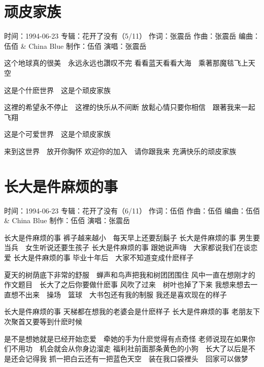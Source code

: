 \documentclass[UTF8,a4paper,oneside,twocolumn,12pt]{ctexbook}
\newcommand{\infopair}[2]{\textbullet #1：#2}
\newcommand{\zc}[1][伍佰]{\infopair{作词}{#1}}
\newcommand{\zq}[1][伍佰]{\infopair{作曲}{#1}}
\newcommand{\bq}[1][伍佰]{\infopair{编曲}{#1}}
\newcommand{\zj}[1]{\infopair{专辑}{#1}}
\newcommand{\zz}[1]{\infopair{制作}{#1}}
\newcommand{\sj}[1]{\infopair{时间}{#1}}
\newenvironment{info}{\begin{flushleft}\kaishu
	}
	{\end{flushleft}\normalsize\yahei\par}
\newenvironment{lyric}{
	}
{}
\begin{document}
\section{顽皮家族}
\begin{info}
	\sj{1994-06-23}
	\zj{花开了没有（5/11）}
	\zc[张震岳]
	\zq[张震岳]
	\bq[伍佰 \& China Blue]
	\zz{伍佰}
	\infopair{演唱}{张震岳}
\end{info}
\begin{lyric}
	这个地球真的很美　永远永远也讚叹不完
	看看蓝天看看大海　乘著那魔毯飞上天空

	这是个什麽世界　这是个顽皮家族

	这裡的希望永不停止　这裡的快乐从不间断
	放鬆心情只要你相信　跟著我来一起飞翔

	这是个可爱世界　这是个顽皮家族

	来到这世界　放开你胸怀
	欢迎你的加入　请你跟我来
	充满快乐的顽皮家族
\end{lyric}

\section{长大是件麻烦的事}
\begin{info}
	\sj{1994-06-23}
	\zj{花开了没有（6/11）}
	\zc
	\zq
	\bq[伍佰 \& China Blue]
	\zz{伍佰}
	\infopair{演唱}{张震岳}
\end{info}
\begin{lyric}
	长大是件麻烦的事
	裤子越来越小　每天早上还要刮鬍子
	长大是件麻烦的事
	男生要当兵　女生听说还要生孩子
	长大是件麻烦的事
	跟她说声嗨　大家都说我们在谈恋爱
	长大是件麻烦的事
	毕业十年后　大家不知道变成什麽样子

	夏天的树荫底下非常的舒服　蝉声和鸟声把我和树团团围住
	风中一直在想刚才的作文题目　长大了之后你要做什麽事
	风吹了过来　树叶也掉了下来
	我想来想去一直想不出来　操场　篮球　大书包还有我的制服
	我还是喜欢现在的样子

	长大是件麻烦的事
	天梯都在想我的老婆会是什麽样子
	长大是件麻烦的事
	老朋友下次聚首又要等到什麽时候

	是不是想她就是已经开始恋爱　牵她的手为什麽觉得有点奇怪
	老师说现在如果你们不用功　机会就会从你身边溜走
	福利社前面那条黄色的小狗　长大了以后是不是还会记得我
	抓一把白云还有一把蓝色天空　装在我口袋裡头　回家可以做梦
\end{lyric}
\end{document}
